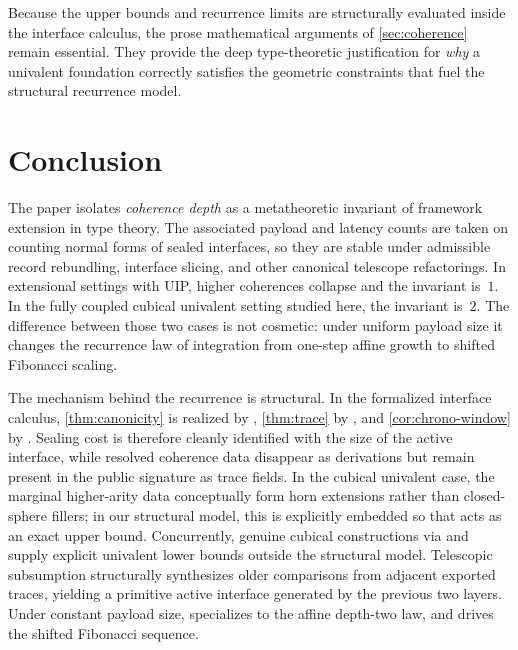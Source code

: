 \documentclass{lmcs}
\begin{document}
\begin{rem}
\label{rem:mech-scope}
Because the upper bounds and recurrence limits are structurally evaluated inside the interface calculus, the prose mathematical arguments of \autoref{sec:coherence} remain essential. They provide the deep type-theoretic justification for \emph{why} a univalent foundation correctly satisfies the geometric constraints that fuel the structural recurrence model.
\end{rem}

\section{Conclusion}
\label{sec:conclusion}

The paper isolates \emph{coherence depth} as a metatheoretic invariant of framework extension in type theory. The associated payload and latency counts are taken on counting normal forms of sealed interfaces, so they are stable under admissible record rebundling, interface slicing, and other canonical telescope refactorings. In extensional settings with UIP, higher coherences collapse and the invariant is~$1$. In the fully coupled cubical univalent setting studied here, the invariant is~$2$. The difference between those two cases is not cosmetic: under uniform payload size it changes the recurrence law of integration from one-step affine growth to shifted Fibonacci scaling.

The mechanism behind the recurrence is structural. In the formalized interface calculus, \autoref{thm:canonicity} is realized by , \autoref{thm:trace} by , and \autoref{cor:chrono-window} by . Sealing cost is therefore cleanly identified with the size of the active interface, while resolved coherence data disappear as derivations but remain present in the public signature as trace fields. In the cubical univalent case, the marginal higher-arity data conceptually form horn extensions rather than closed-sphere fillers; in our structural model, this is explicitly embedded so that  acts as an exact upper bound. Concurrently, genuine cubical constructions via  and  supply explicit univalent lower bounds outside the structural model. Telescopic subsumption structurally synthesizes older comparisons from adjacent exported traces, yielding a primitive active interface generated by the previous two layers. Under constant payload size,  specializes to the affine depth-two law, and  drives the shifted Fibonacci sequence.
\end{document}
